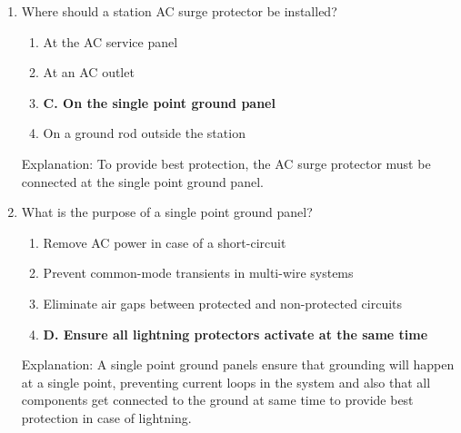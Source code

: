 \begin{enumerate}
     \item Where should a station AC surge protector be installed?
      \begin{enumerate}
       \item  At the AC service panel
       \item  At an AC outlet
      \item \textbf{C. On the single point ground panel}
        \item  On a ground rod outside the station
        \end{enumerate}
       \textcolor{myred}{Explanation:}
       To provide best protection, the AC surge protector must be connected at the single point ground panel.
         
      \item What is the purpose of a single point ground panel?
       \begin{enumerate}
       \item  Remove AC power in case of a short-circuit
       \item  Prevent common-mode transients in multi-wire systems
         \item  Eliminate air gaps between protected and non-protected circuits
        \item \textbf{D. Ensure all lightning protectors activate at the same time}
        \end{enumerate}
        \textcolor{myred}{Explanation:}
    A single point ground panels ensure that grounding will happen at a single point, preventing current loops in the system and also that all components get connected to the ground at same time to provide best protection in case of lightning.
\end{enumerate}

